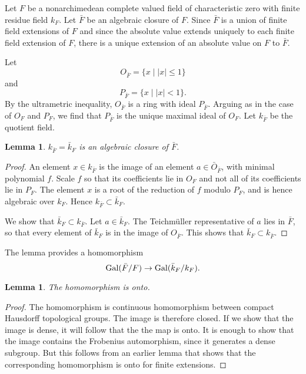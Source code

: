 \documentclass{amsart}
\newtheorem{lemma}[equation]{Lemma}
\def\abs#1{{|#1|}}
\begin{document}
Let $F$ be a nonarchimedean
complete valued field of characteristic zero with finite residue field $k_F$.
Let $\bar{F}$ be an algebraic closure of $F$.  Since $\bar{F}$ is a union of
finite field extensions of $F$ and since the absolute value extends uniquely to
each finite field extension of $F$, there is a unique extension of an absolute
value on $F$ to $\bar{F}$.

Let 
\[
O_{\bar F} = \{x \mid \abs{x}\le 1\}
\]
and
\[
P_{\bar F} = \{x \mid \abs{x} < 1\}.
\]
By the ultrametric inequality, $O_{\bar F}$ is a ring with ideal $P_{\bar F}$.
Arguing as in the case of $O_F$ and $P_F$, we find that $P_{\bar F}$ is the unique
maximal ideal of $O_F$.  Let $k_{\bar F}$ be the quotient field.

\begin{lemma}
$k_{\bar F} = \bar{k}_F$
is an algebraic closure of $\bar{F}$.
\end{lemma}

\begin{proof} An element $x\in k_{\bar F}$ is the image of an element
  $a\in\bar O_{\bar F}$, with minimal polynomial $f$.  Scale $f$ so
  that its coefficients lie in $O_{F}$ and not all of its coefficients
  lie in $P_F$.  The element $x$ is a root of the reduction of $f$
  modulo $P_F$, and is hence algebraic over $k_F$.  Hence $ k_{\bar
    F}\subset \bar{k}_F$.

We show that $\bar{k}_F\subset k_{\bar F}$.  Let $a\in \bar{k}_F$.
The Teichm\"uller representative of $a$ lies in $\bar F$, so that every
element of $\bar{k}_F$ is in the image of $O_{\bar F}$.  This shows
that $\bar{k}_F\subset k_{\bar F}$.
\end{proof}

The lemma provides a homomorphism
\[
{\operatorname{Gal}}(\bar F/F)\to {\operatorname{Gal}}(\bar{k}_{F}/k_F).
\]

\begin{lemma} The homomorphism is onto.
\end{lemma}


\begin{proof} The homomorphism is continuous homomorphism between compact
Hausdorff topological groups.  The image is therefore closed.  If we show
that the image is dense, it will follow that the the map is onto.  It is
enough to show that the image contains the Frobenius automorphism, since
it generates a dense subgroup. 
But this follows from an earlier lemma
that shows that the corresponding homomorphism is onto for finite extensions.
\end{proof}
\end{document}
